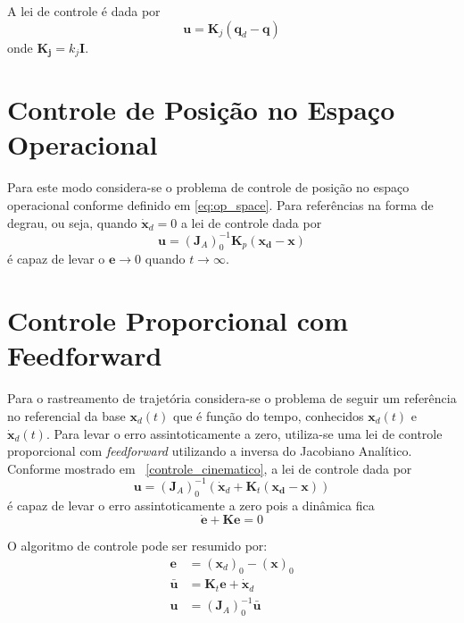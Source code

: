 A lei de controle é dada por 
\begin{equation}
\bm{u} = \bm{K}_j (\bm{q}_d - \bm{q})
\end{equation}
onde $\bm{K_j} = k_j \bm{I}$.

\section{Controle de Posição no Espaço Operacional} \label{sec:pos_operacional}
Para este modo considera-se o problema de controle de posição no espaço operacional conforme definido em \ref{eq:op_space}. Para referências na forma de degrau, ou seja, quando $\dot{\bm{x}}_d = 0$ a lei de controle dada por
\begin{equation} \label{eq:lei_posicao}
\bm{u} = (\bm{J}_{A})_0^{-1} \bm{K}_p (\bm{x_d} - \bm{x})
\end{equation}
é capaz de levar o $\bm{e} \rightarrow 0$ quando $t \rightarrow \infty$.

\section{Controle Proporcional com Feedforward} \label{sec:pplusf}
Para o rastreamento de trajetória considera-se o problema de seguir um referência no referencial da base $\bm{x}_d(t)$ que é função do tempo, conhecidos $\bm{x}_d(t)$ e $\bm{\dot{x}}_d(t)$. Para levar o erro assintoticamente a zero, utiliza-se uma lei de controle proporcional com \textit{feedforward} utilizando a inversa do Jacobiano Analítico. Conforme mostrado em ~\ref{controle_cinematico}, a lei de controle dada por 
\begin{equation}
\bm{u} = (\bm{J}_{A})_0^{-1} (\dot{\bm{x}}_d + \bm{K}_t (\bm{x_d} - \bm{x}))
\end{equation} 
é capaz de levar o erro assintoticamente a zero pois a dinâmica fica 
\begin{equation}
\dot{\bm{e}} + \bm{K} \bm{e} = 0
\end{equation}

O algoritmo de controle pode ser resumido por:
\begin{align}
\bm{e} &= (\bm{x}_d)_0 - (\bm{x})_0  \label{eq:error_pf}\\
\bm{\bar{u}} &= \bm{K}_t \bm{e} + \bm{\dot{x}}_d \\
\bm{u} &= (\bm{J}_A)_0^{-1} \bm{\bar{u}}
\end{align}


